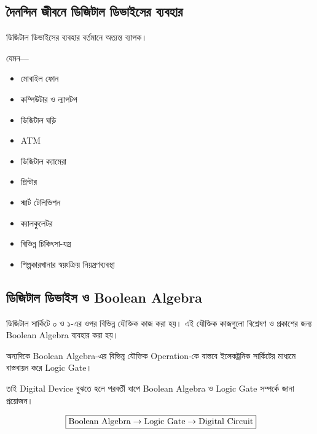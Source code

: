 
\subsection{দৈনন্দিন জীবনে ডিজিটাল ডিভাইসের ব্যবহার}

ডিজিটাল ডিভাইসের ব্যবহার বর্তমানে অত্যন্ত ব্যাপক।

যেমন—

\begin{itemize}[label={{\bulletfont\textbullet}}, leftmargin=*, nosep]
    \item মোবাইল ফোন
    \item কম্পিউটার ও ল্যাপটপ
    \item ডিজিটাল ঘড়ি
    \item \textenglish{ATM}
    \item ডিজিটাল ক্যামেরা
    \item প্রিন্টার
    \item স্মার্ট টেলিভিশন
    \item ক্যালকুলেটর
    \item বিভিন্ন চিকিৎসা-যন্ত্র
    \item শিল্পকারখানার স্বয়ংক্রিয় নিয়ন্ত্রণব্যবস্থা
\end{itemize}


\subsection{ডিজিটাল ডিভাইস ও
\textenglish{Boolean Algebra}}

ডিজিটাল সার্কিটে ০ ও ১-এর ওপর বিভিন্ন যৌক্তিক কাজ করা হয়।
এই যৌক্তিক কাজগুলো বিশ্লেষণ ও প্রকাশের জন্য
\textenglish{Boolean Algebra} ব্যবহার করা হয়।

অন্যদিকে \textenglish{Boolean Algebra}-এর বিভিন্ন যৌক্তিক
\textenglish{Operation}-কে বাস্তবে ইলেকট্রনিক সার্কিটের মাধ্যমে
বাস্তবায়ন করে \textenglish{Logic Gate}।

তাই \textenglish{Digital Device} বুঝতে হলে
পরবর্তী ধাপে \textenglish{Boolean Algebra} ও
\textenglish{Logic Gate} সম্পর্কে জানা প্রয়োজন।

\[
\boxed{
\text{\textenglish{Boolean Algebra}}
\rightarrow
\text{\textenglish{Logic Gate}}
\rightarrow
\text{\textenglish{Digital Circuit}}
}
\]

